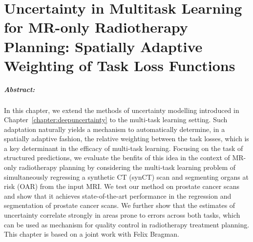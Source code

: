 
\chapter{Uncertainty in Multitask Learning for MR-only Radiotherapy Planning: Spatially Adaptive Weighting of Task Loss Functions} \label{chapter:multitaskuncertainty_part1}

\paragraph{Abstract:} In this chapter, we extend the methods of uncertainty modelling introduced in Chapter~\ref{chapter:deepuncertainty} to the multi-task learning setting. Such adaptation naturally yields a mechanism to automatically determine, in a spatially adaptive fashion, the relative weighting between the task losses, which is a key determinant in the efficacy of multi-task learning. Focusing on the task of structured predictions, we evaluate the benfits of this idea in the context of MR-only radiotherapy planning by considering the multi-task learning problem of simultaneously regressing a synthetic CT (synCT) scan and segmenting  organs at risk (OAR) from the input MRI. We test our method on prostate cancer scans and show that it achieves state-of-the-art performance in the regression and segmentation of prostate cancer scans. We further show that the estimates of uncertainty correlate strongly in areas prone to errors across both tasks, which can be used as mechanism for quality control in radiotherapy treatment planning. This chapter is based on a joint work \cite{bragman2018uncertainty} with Felix Bragman.


